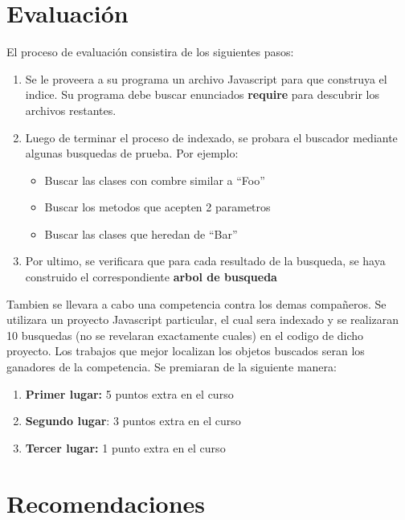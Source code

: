 \documentclass{article}
\begin{document}
\section{Evaluaci\'on}
El proceso de evaluaci\'on consistira de los siguientes pasos:
\begin{enumerate}
        \item{Se le proveera a su programa un archivo Javascript para que construya el indice.
        Su programa debe buscar enunciados {\bf require} para descubrir los archivos restantes.}
        \item{Luego de terminar el proceso de indexado, se probara el buscador mediante algunas
        busquedas de prueba. Por ejemplo:
        \begin{itemize}
                \item{Buscar las clases con combre similar a ``Foo''}
                \item{Buscar los metodos que acepten 2 parametros}
                \item{Buscar las clases que heredan de ``Bar''}
        \end{itemize}}
        \item{Por ultimo, se verificara que para cada resultado de la busqueda, se haya construido
        el correspondiente {\bf arbol de busqueda}}
\end{enumerate}

Tambien se llevara a cabo una competencia contra los demas compa\~neros. Se utilizara un proyecto
Javascript particular, el cual sera indexado y se realizaran 10 busquedas (no se revelaran exactamente
cuales) en el codigo de dicho proyecto. Los trabajos que mejor localizan los objetos buscados seran
los ganadores de la competencia. Se premiaran de la siguiente manera:
\begin{enumerate}
        \item{{\bf Primer lugar:} 5 puntos extra en el curso}
        \item{{\bf Segundo lugar}: 3 puntos extra en el curso}
        \item{{\bf Tercer lugar:} 1 punto extra en el curso}
\end{enumerate}

\section{Recomendaciones}
\end{document}

